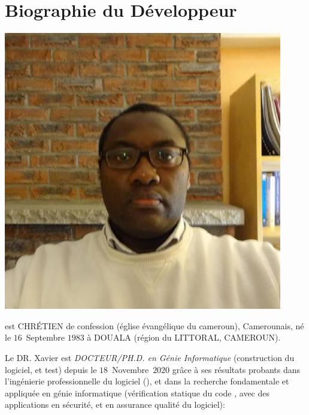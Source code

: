 \section{Biographie du Développeur}\label{chap:biographie}
\vspace{-0.9em}

\begin{center}
\includegraphics[scale=0.32]{../../francais/images/XavierNOUNDOU-2}
\end{center}

\textbf{\myfullacademicname} est CHRÉTIEN de confession
(église évangélique du cameroun),
Camerounais, né le $16$~Septembre $1983$ à
DOUALA (région du LITTORAL, CAMEROUN).

Le DR. Xavier est \textit{DOCTEUR/PH.D. en Génie Informatique}
(construction du logiciel, et test) depuis le $18$~Novembre~$2020$
grâce à ses résultats probants dans l'ingénierie
professionnelle du logiciel (\yerothpgiblack), et dans la recherche
fondamentale et appliquée en génie informatique
(vérification statique du code \cplusplus, avec des applications
en sécurité, et en assurance qualité du logiciel):

